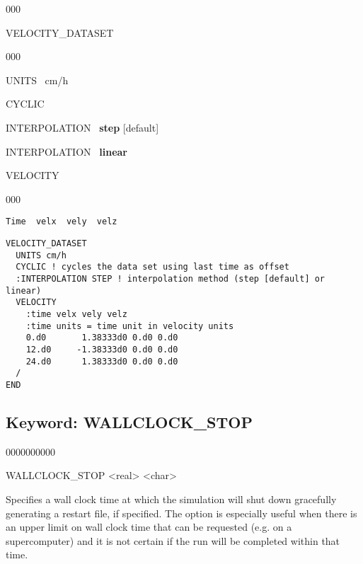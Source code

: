 \begin{deflist}{000}
\item[VELOCITY\_DATASET] ~
\begin{deflist}{000}
\item[UNITS] \ cm/h
\item[CYCLIC]
\item[INTERPOLATION] \ {\bf step} [default]
\item[INTERPOLATION] \ {\bf linear}
\item[VELOCITY] ~
\begin{deflist}{000}
\item[{\tt Time \ velx \ vely \ velz}]
\end{deflist}
\item[\keyend]
\end{deflist}
\item[\keyend]
\end{deflist}


\begin{mdframed}

\begin{verbatim}
VELOCITY_DATASET
  UNITS cm/h
  CYCLIC ! cycles the data set using last time as offset
  :INTERPOLATION STEP ! interpolation method (step [default] or linear)
  VELOCITY
    :time velx vely velz
    :time units = time unit in velocity units
    0.d0       1.38333d0 0.d0 0.d0 
    12.d0     -1.38333d0 0.d0 0.d0 
    24.d0      1.38333d0 0.d0 0.d0 
  /
END
\end{verbatim}

\end{mdframed}

\hyperlink{target_key}{\return}


\newpage
\protect\hypertarget{target_wallclk}{}

\subsection{Keyword: WALLCLOCK\_STOP}
\begin{deflist}{0000000000}
\item[WALLCLOCK\_STOP] <real> <char>
\end{deflist}

 Specifies a wall clock time at which the simulation will shut down gracefully generating a restart file, if specified. The option is especially useful when there is an upper limit on wall clock time that can be requested (e.g. on a supercomputer) and it is not certain if the run will be completed within that time.

